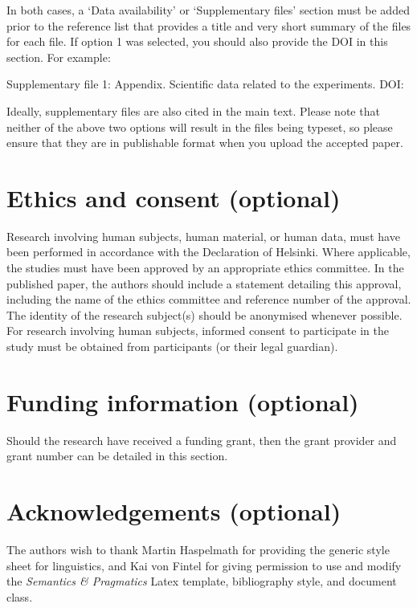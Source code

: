 \documentclass[charis,linguex,biblatex]{glossa}
\begin{document}
\noindent In both cases, a `Data availability' or `Supplementary files' section must be added prior to the reference list that provides a title and very short summary of the files for each file. If option 1 was selected, you should also provide the DOI in this section. For example:

\noindent Supplementary file 1: Appendix. Scientific data related to the experiments. DOI: 

Ideally, supplementary files are also cited in the main text. Please note that neither of the above two options will result in the files being typeset, so please ensure that they are in publishable format when you upload the accepted paper.


\section*{Ethics and consent (optional)}

Research involving human subjects, human material, or human data, must have been performed in accordance with the Declaration of Helsinki. Where applicable, the studies must have been approved by an appropriate ethics committee. In the published paper, the authors should include a statement detailing this approval, including the name of the ethics committee and reference number of the approval. The identity of the research subject(s) should be anonymised whenever possible. For research involving human subjects, informed consent to participate in the study must be obtained from participants (or their legal guardian).


\section*{Funding information (optional)}

Should the research have received a funding grant, then the grant provider and grant number can be detailed in this section. 

\section*{Acknowledgements (optional)}

The authors wish to thank Martin Haspelmath for providing the generic style sheet for linguistics, and Kai von Fintel for giving permission to use and modify the \textit{Semantics \& Pragmatics} Latex template, bibliography style, and document class.
\end{document}
